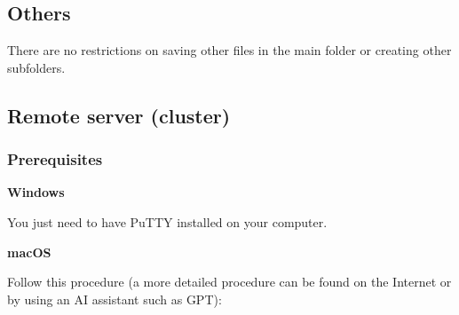 \documentclass{article}
\begin{document}
\subsection{Others}

There are no restrictions on saving other files in the main folder or creating other subfolders.

\subsection{Remote server (cluster)}

\subsubsection{Prerequisites}

\textbf{Windows} \newline

You just need to have PuTTY installed on your computer.
\newline

\textbf{macOS} \newline

Follow this procedure (a more detailed procedure can be found on the Internet or by using an AI assistant such as GPT):
\end{document}
